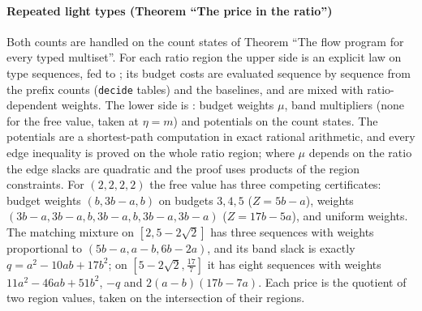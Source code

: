 \paragraph{Repeated light types (Theorem ``The price in the ratio'')} Both counts are handled on the
count states of Theorem ``The flow program for every typed multiset''. For each ratio region the
upper side is an explicit law on type sequences, fed to ; its budget
costs are evaluated sequence by sequence from the prefix counts (\texttt{decide} tables) and the
baselines, and are mixed with ratio-dependent weights. The lower side is : budget
weights $\mu$, band multipliers (none for the free value, taken at $\eta=m$) and potentials on the
count states. The potentials are a shortest-path computation in exact rational arithmetic, and
every edge inequality is proved on the whole ratio region; where $\mu$ depends on the ratio the
edge slacks are quadratic and the proof uses products of the region constraints. For $(2,2,2,2)$
the free value has three competing certificates: budget weights $(b,3b-a,b)$ on budgets $3,4,5$
($Z=5b-a$), weights $(3b-a,3b-a,b,3b-a,b,3b-a,3b-a)$ ($Z=17b-5a$), and uniform weights. The
matching mixture on $[2,5-2\sqrt2]$ has three sequences with weights proportional to
$(5b-a,a-b,6b-2a)$, and its band slack is exactly $q=a^2-10ab+17b^2$; on $[5-2\sqrt2,\frac{17}7]$
it has eight sequences with weights $11a^2-46ab+51b^2$, $-q$ and $2(a-b)(17b-7a)$. Each price is the
quotient of two region values, taken on the intersection of their regions.

